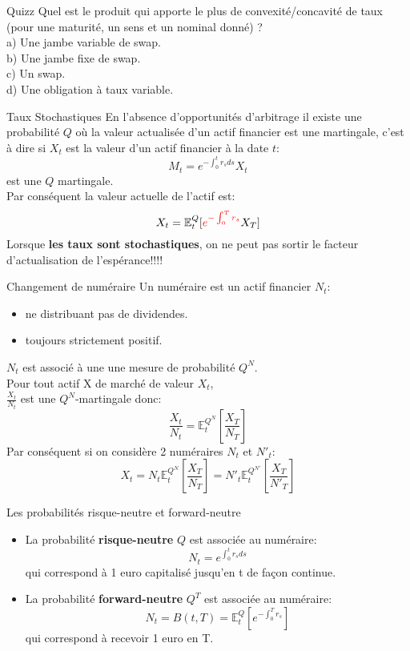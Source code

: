 \documentclass{beamer}
\begin{document}
\begin{frame}{Quizz}
Quel est le produit qui apporte le plus de convexité/concavité de taux (pour une maturité, un sens et un nominal donné) ?\\
\vspace{0.5cm}
a) Une jambe variable de swap.\\
b) Une jambe fixe de swap.\\
c) Un swap.\\
d) Une obligation à taux variable.\\
\end{frame}

\begin{frame}{Taux Stochastiques}
En l'absence d'opportunités d'arbitrage il existe une probabilité $Q$ où la valeur actualisée d'un actif financier est une martingale, c'est à dire si $X_t$ est la valeur d'un actif financier à la date $t$:
\[
	M_t = e^{-\int_0^t r_s ds}X_t
\]
est une $Q$ martingale.\\
Par conséquent la valeur actuelle de l'actif est:
\[
	X_t=\mathbb{E}^Q_t[\color{red} e^{-\int_0^T r_s} \color{black} X_T]
\]
Lorsque \color{red}\textbf{les taux sont stochastiques}\color{black}, on ne peut pas sortir le facteur d'actualisation de l'espérance!!!!
\end{frame}

\begin{frame}{Changement de numéraire}
Un numéraire est un actif financier $N_t$:
\begin{itemize}
\item ne distribuant pas de dividendes.
\item toujours strictement positif.
\end{itemize}
\vspace{0.5cm}
$N_t$ est associé à une une mesure de probabilité $Q^N$.\\
\vspace{0.5cm}
Pour tout actif X de marché de valeur $X_t$,\\
 $\frac{X_t}{N_t}$ est une $Q^N$-martingale donc:
\[
\frac{X_t}{N_t}=\mathbb{E}^{Q^N}_t\left[\frac{X_T}{N_T}\right]
\]
\vspace{0.5cm}
Par conséquent si on considère 2 numéraires $N_t$ et $N'_t$:
\[
X_t=N_t\mathbb{E}^{Q^N}_t\left[\frac{X_T}{N_T}\right]=N'_t\mathbb{E}^{Q^{N'}}_t\left[\frac{X_T}{N'_T}\right]
\]
\end{frame}

\begin{frame}{Les probabilités risque-neutre et forward-neutre}
\begin{itemize}
\item La probabilité \textbf{risque-neutre} $Q$ est associée au numéraire:
\[
N_t=e^{\int_0^t r_s ds }
\]
qui correspond à 1 euro capitalisé jusqu'en t de façon continue.
\vspace{0.5cm}\\
\item La probabilité \textbf{forward-neutre} $Q^T$ est associée au numéraire:
\[
N_t=B(t,T)=\mathbb{E}^Q_t[e^{-\int_0^T r_s}]
\]
qui correspond à recevoir 1 euro en T.
\end{itemize}

\end{frame}
\end{document}

